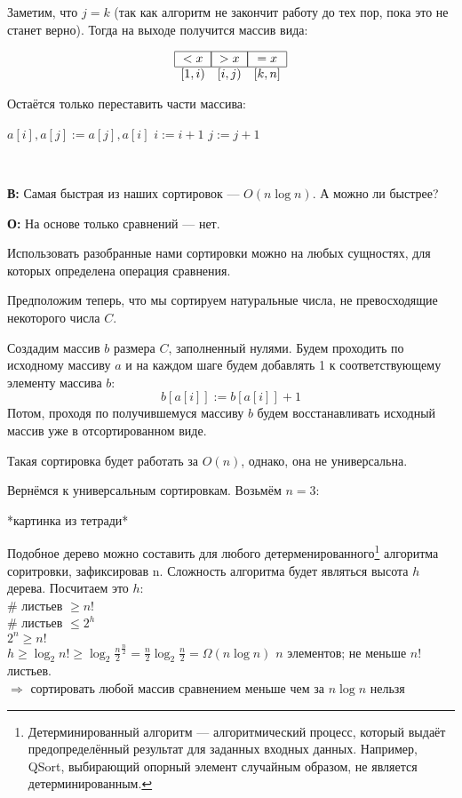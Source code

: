 \documentclass[12pt,a4paper]{article}
\begin{document}
Заметим, что $j = k$ (так как алгоритм не закончит работу до тех пор, пока это не станет верно). Тогда на выходе получится массив вида:

\[\begin{array}{lll}
    \hline
    \multicolumn{1}{|c|}{<x} & \multicolumn{1}{|c|}{>x} & \multicolumn{1}{|c|}{=x}\\
    \hline
    [1, i) & [i, j) & [k, n]
\end{array}\]

Остаётся только переставить части массива:

\begin{algorithm}
\begin{algorithmic}[1]
	\State $a[i], a[j] \mathrel{:=} a[j], a[i]$
	\State $i \mathrel{:=} i + 1$
	\State $j \mathrel{:=} j + 1$
\EndWhile
\end{algorithmic}
\end{algorithm}
 
\

\textbf{В:} Самая быстрая из наших сортировок --- $O(n \log n)$. А можно ли быстрее?

\textbf{О:} На основе только сравнений --- нет. 

Использовать разобранные нами сортировки можно на любых сущностях, для которых определена операция сравнения.

Предположим теперь, что мы сортируем натуральные числа, не превосходящие некоторого числа $C$.

Создадим массив $b$ размера $C$, заполненный нулями. Будем проходить по исходному массиву $a$ и на каждом шаге будем добавлять 1 к соответствующему элементу массива $b$: 
\[b[a[i]] \mathrel{:=} b[a[i]] + 1\]
Потом, проходя по получившемуся массиву $b$ будем восстанавливать исходный массив уже в отсортированном виде.

Такая сортировка будет работать за $O(n)$, однако, она не универсальна.

Вернёмся к универсальным сортировкам. Возьмём $n = 3$:

*картинка из тетради*

Подобное дерево можно составить для любого детерменированного\footnote{Детерминированный алгоритм — алгоритмический процесс, который выдаёт предопределённый результат для заданных входных данных. Например, QSort, выбирающий опорный элемент случайным образом, не является детерминированным.} алгоритма соритровки, зафиксировав n. Сложность алгоритма будет являться высота $h$ дерева. Посчитаем это $h$:\\
\# листьев $\geqslant n!$\\
 \# листьев $\leqslant 2^h$\\
$2^n \geqslant n!$\\
$h \geqslant \log_2 n! \geqslant \log_2 \frac{n}{2}^{\frac{n}{2}} = \frac{n}{2}\log_2{\frac{n}{2}} = \Omega(n\log n)$
$n$ элементов; не меньше $n!$ листьев.\\
$\Rightarrow$ сортировать любой массив сравнением меньше чем за $n\log n$ нельзя
\end{document}
